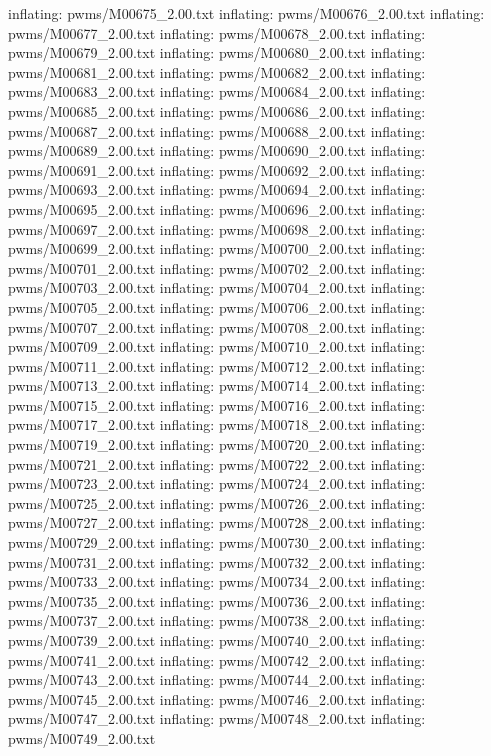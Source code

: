 \documentclass[letterpaper,10pt,english]{sphinxmanual}
\begin{document}
{\begin{sphinxVerbatim}[commandchars=\\\{\}]
  inflating: pwms/M00675\_2.00.txt
  inflating: pwms/M00676\_2.00.txt
  inflating: pwms/M00677\_2.00.txt
  inflating: pwms/M00678\_2.00.txt
  inflating: pwms/M00679\_2.00.txt
  inflating: pwms/M00680\_2.00.txt
  inflating: pwms/M00681\_2.00.txt
  inflating: pwms/M00682\_2.00.txt
  inflating: pwms/M00683\_2.00.txt
  inflating: pwms/M00684\_2.00.txt
  inflating: pwms/M00685\_2.00.txt
  inflating: pwms/M00686\_2.00.txt
  inflating: pwms/M00687\_2.00.txt
  inflating: pwms/M00688\_2.00.txt
  inflating: pwms/M00689\_2.00.txt
  inflating: pwms/M00690\_2.00.txt
  inflating: pwms/M00691\_2.00.txt
  inflating: pwms/M00692\_2.00.txt
  inflating: pwms/M00693\_2.00.txt
  inflating: pwms/M00694\_2.00.txt
  inflating: pwms/M00695\_2.00.txt
  inflating: pwms/M00696\_2.00.txt
  inflating: pwms/M00697\_2.00.txt
  inflating: pwms/M00698\_2.00.txt
  inflating: pwms/M00699\_2.00.txt
  inflating: pwms/M00700\_2.00.txt
  inflating: pwms/M00701\_2.00.txt
  inflating: pwms/M00702\_2.00.txt
  inflating: pwms/M00703\_2.00.txt
  inflating: pwms/M00704\_2.00.txt
  inflating: pwms/M00705\_2.00.txt
  inflating: pwms/M00706\_2.00.txt
  inflating: pwms/M00707\_2.00.txt
  inflating: pwms/M00708\_2.00.txt
  inflating: pwms/M00709\_2.00.txt
  inflating: pwms/M00710\_2.00.txt
  inflating: pwms/M00711\_2.00.txt
  inflating: pwms/M00712\_2.00.txt
  inflating: pwms/M00713\_2.00.txt
  inflating: pwms/M00714\_2.00.txt
  inflating: pwms/M00715\_2.00.txt
  inflating: pwms/M00716\_2.00.txt
  inflating: pwms/M00717\_2.00.txt
  inflating: pwms/M00718\_2.00.txt
  inflating: pwms/M00719\_2.00.txt
  inflating: pwms/M00720\_2.00.txt
  inflating: pwms/M00721\_2.00.txt
  inflating: pwms/M00722\_2.00.txt
  inflating: pwms/M00723\_2.00.txt
  inflating: pwms/M00724\_2.00.txt
  inflating: pwms/M00725\_2.00.txt
  inflating: pwms/M00726\_2.00.txt
  inflating: pwms/M00727\_2.00.txt
  inflating: pwms/M00728\_2.00.txt
  inflating: pwms/M00729\_2.00.txt
  inflating: pwms/M00730\_2.00.txt
  inflating: pwms/M00731\_2.00.txt
  inflating: pwms/M00732\_2.00.txt
  inflating: pwms/M00733\_2.00.txt
  inflating: pwms/M00734\_2.00.txt
  inflating: pwms/M00735\_2.00.txt
  inflating: pwms/M00736\_2.00.txt
  inflating: pwms/M00737\_2.00.txt
  inflating: pwms/M00738\_2.00.txt
  inflating: pwms/M00739\_2.00.txt
  inflating: pwms/M00740\_2.00.txt
  inflating: pwms/M00741\_2.00.txt
  inflating: pwms/M00742\_2.00.txt
  inflating: pwms/M00743\_2.00.txt
  inflating: pwms/M00744\_2.00.txt
  inflating: pwms/M00745\_2.00.txt
  inflating: pwms/M00746\_2.00.txt
  inflating: pwms/M00747\_2.00.txt
  inflating: pwms/M00748\_2.00.txt
  inflating: pwms/M00749\_2.00.txt

\end{sphinxVerbatim}}
\end{document}
